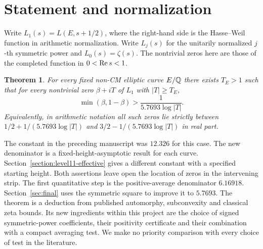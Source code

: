 \documentclass[11pt]{article}
\newtheorem{theorem}{Theorem}[section]\newtheorem{lemma}[theorem]{Lemma}\newtheorem{corollary}[theorem]{Corollary}
\begin{document}
\section{Statement and normalization}
Write $L_1(s)=L(E,s+1/2)$, where the right-hand side is the Hasse--Weil function in arithmetic normalization. Write $L_j(s)$ for the unitarily normalized $j$-th symmetric power and $L_0(s)=\zeta(s)$. The nontrivial zeros here are those of the completed function in $0<\operatorname{Re} s<1$.
\begin{theorem}\label{main}
For every fixed non-CM elliptic curve $E/\mathbb Q$ there exists $T_E>1$ such that for every nontrivial zero $\beta+iT$ of $L_1$ with $|T|\ge T_E$,
\[
       \min(\beta,1-\beta)>\frac{1}{5.7693\log|T|}.
\]
Equivalently, in arithmetic notation all such zeros lie strictly between $1/2+1/(5.7693\log |T|)$ and $3/2-1/(5.7693\log |T|)$ in real part.
\end{theorem}
The constant in the preceding manuscript was $12.326$ for this case. The new denominator is a fixed-height-asymptotic result for each curve. Section~\ref{section:level11-effective} gives a different constant with a specified starting height. Both assertions leave open the location of zeros in the intervening strip. The first quantitative step is the positive-average denominator $6.16918$. Section~\ref{sec:final} uses the symmetric square to improve it to $5.7693$. The theorem is a deduction from published automorphy, subconvexity and classical zeta bounds. Its new ingredients within this project are the choice of signed symmetric-power coefficients, their positivity certificate and their combination with a compact averaging test. We make no priority comparison with every choice of test in the literature.
\end{document}
